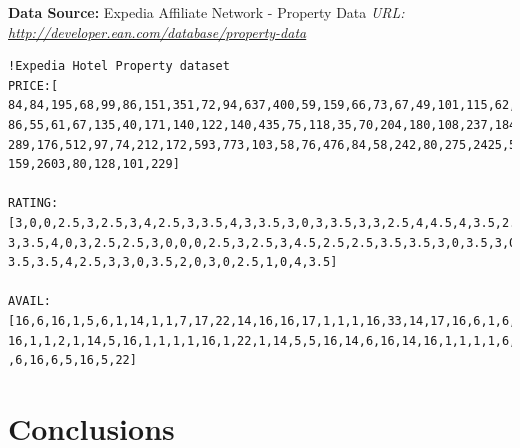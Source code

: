 \documentclass[paper=a4, fontsize=11pt]{scrartcl} %
\begin{document}
\textbf{Data Source:} Expedia Affiliate Network - Property Data \textit{URL: \url{http://developer.ean.com/database/property-data}} \\
\begin{verbatim}
!Expedia Hotel Property dataset
PRICE:[ 84,84,195,68,99,86,151,351,72,94,637,400,59,159,66,73,67,49,101,115,62,180,253,272,143,
86,55,61,67,135,40,171,140,122,140,435,75,118,35,70,204,180,108,237,184,140,107,100,262,109,327,
289,176,512,97,74,212,172,593,773,103,58,76,476,84,58,242,80,275,2425,57,75,87,87,55,29,359,143,
159,2603,80,128,101,229]	 	

RATING: [3,0,0,2.5,3,2.5,3,4,2.5,3,3.5,4,3,3.5,3,0,3,3.5,3,3,2.5,4,4.5,4,3.5,2.5,2,3,0,3,3,3,2.5,
3,3.5,4,0,3,2.5,2.5,3,0,0,0,2.5,3,2.5,3,4.5,2.5,2.5,3.5,3.5,3,0,3.5,3,0,0,3.5,3,3.5,0,3,2,3,4,
3.5,3.5,4,2.5,3,3,0,3.5,2,0,3,0,2.5,1,0,4,3.5]

AVAIL:[16,6,16,1,5,6,1,14,1,1,7,17,22,14,16,16,17,1,1,1,16,33,14,17,16,6,1,6,6,5,33,14,1,1,16,14,
16,1,1,2,1,14,5,16,1,1,1,1,16,1,22,1,14,5,5,16,14,6,16,14,16,1,1,1,1,6,1,11,1,17,32,1,1,16,6,12,4
,6,16,6,5,16,5,22] 
\end{verbatim}

\section{Conclusions}
\clearpage
{}
\end{document}
